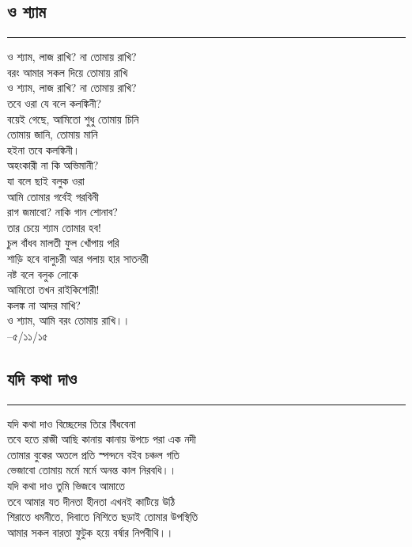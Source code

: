 \documentclass[12pt]{article}
\begin{document}
\subsection*{ও শ্যাম }
\hrule
\vspace{1in}
ও শ্যাম, লাজ রাখি? না তোমায় রাখি?\\
বরং আমার সকল দিয়ে তোমায় রাখি\\
ও শ্যাম, লাজ রাখি? না তোমায় রাখি?\\

\noindent
তবে ওরা যে বলে কলঙ্কিনী?\\
বয়েই গেছে, আমিতো শুধু তোমায় চিনি\\
তোমায় জানি, তোমায় মানি\\
হইনা তবে কলঙ্কিনী।\\

\noindent
অহংকারী না কি অভিমানী?\\
যা বলে ছাই বলুক ওরা\\
আমি তোমার গর্বেই গরবিনী\\
রাগ জমাবো? নাকি গান শোনাব?\\
তার চেয়ে শ্যাম তোমার হব!\\

\noindent
চুল বাঁধব মালতী ফুল খোঁপায় পরি\\
শাড়ি হবে বালুচরী আর গলায় হার সাতনরী\\
নষ্ট বলে বলুক লোকে\\
আমিতো তখন রাইকিশোরী!\\

\noindent
কলঙ্ক না আদর মাখি?\\
ও শ্যাম, আমি বরং তোমায় রাখি।।\\

--৫/১১/১৫
\newpage

\subsection*{যদি কথা দাও}
\hrule
\vspace{1in}
যদি কথা দাও বিচ্ছেদের তিরে বিঁধবেনা\\
তবে হতে রাজী আছি কানায় কানায় উপচে পরা এক নদী\\
তোমার বুকের অতলে প্রতি স্পন্দনে বইব চঞ্চল গতি\\
ভেজাবো তোমায় মর্মে মর্মে অনন্ত কাল নিরবধি।।\\

\noindent
যদি কথা দাও তুমি ভিজবে আমাতে\\
তবে আমার যত দীনতা হীনতা এখনই কাটিয়ে উঠি\\
শিরাতে ধমনীতে, দিবাতে নিশিতে ছড়াই তোমার উপস্থিতি\\
আমার সকল বারতা ফুটুক হয়ে বর্ষার নিপবীথি।।\\
\end{document}
